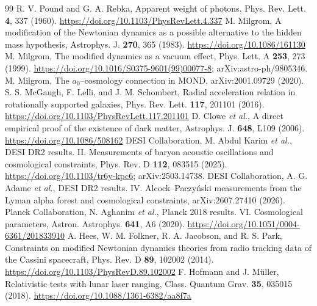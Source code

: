 \documentclass[aps,prd,twocolumn,superscriptaddress,nofootinbib,showkeys]{revtex4-2}
\begin{document}
\begin{thebibliography}{99}
 R. V. Pound and G. A. Rebka, Apparent weight of photons, Phys. Rev. Lett. \textbf{4}, 337 (1960). \url{https://doi.org/10.1103/PhysRevLett.4.337}
 M. Milgrom, A modification of the Newtonian dynamics as a possible alternative to the hidden mass hypothesis, Astrophys. J. \textbf{270}, 365 (1983). \url{https://doi.org/10.1086/161130}
 M. Milgrom, The modified dynamics as a vacuum effect, Phys. Lett. A \textbf{253}, 273 (1999). \url{https://doi.org/10.1016/S0375-9601(99)00077-8}; arXiv:astro-ph/9805346.
 M. Milgrom, The $a_0$--cosmology connection in MOND, arXiv:2001.09729 (2020).
 S. S. McGaugh, F. Lelli, and J. M. Schombert, Radial acceleration relation in rotationally supported galaxies, Phys. Rev. Lett. \textbf{117}, 201101 (2016). \url{https://doi.org/10.1103/PhysRevLett.117.201101}
 D. Clowe \emph{et al.}, A direct empirical proof of the existence of dark matter, Astrophys. J. \textbf{648}, L109 (2006). \url{https://doi.org/10.1086/508162}
 DESI Collaboration, M. Abdul Karim \emph{et al.}, DESI DR2 results. II. Measurements of baryon acoustic oscillations and cosmological constraints, Phys. Rev. D \textbf{112}, 083515 (2025). \url{https://doi.org/10.1103/tr6y-kpc6}; arXiv:2503.14738.
 DESI Collaboration, A. G. Adame \emph{et al.}, DESI DR2 results. IV. Alcock--Paczy\'nski measurements from the Lyman alpha forest and cosmological constraints, arXiv:2607.27410 (2026).
 Planck Collaboration, N. Aghanim \emph{et al.}, Planck 2018 results. VI. Cosmological parameters, Astron. Astrophys. \textbf{641}, A6 (2020). \url{https://doi.org/10.1051/0004-6361/201833910}
 A. Hees, W. M. Folkner, R. A. Jacobson, and R. S. Park, Constraints on modified Newtonian dynamics theories from radio tracking data of the Cassini spacecraft, Phys. Rev. D \textbf{89}, 102002 (2014). \url{https://doi.org/10.1103/PhysRevD.89.102002}
 F. Hofmann and J. M\"uller, Relativistic tests with lunar laser ranging, Class. Quantum Grav. \textbf{35}, 035015 (2018). \url{https://doi.org/10.1088/1361-6382/aa8f7a}
\end{thebibliography}
\end{document}
